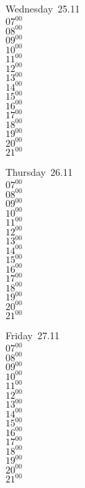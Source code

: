 \documentclass[11pt,a4paper]{book}\usepackage[]{graphicx}\usepackage[]{color}
\begin{document}
\begin{weekdaybox}
  Wednesday~25.11\\
  { 
  \vfill
  $07^{00}$\\
$08^{00}$\\
$09^{00}$\\
$10^{00}$\\
$11^{00}$\\
$12^{00}$\\
$13^{00}$\\
$14^{00}$\\
$15^{00}$\\
$16^{00}$\\
$17^{00}$\\
$18^{00}$\\
$19^{00}$\\
$20^{00}$\\
$21^{00}$\\
  }
\end{weekdaybox}
\clearpage
\begin{headerbox}
\end{headerbox}
\begin{weekdaybox}
  Thursday~26.11\\
  { 
  \vfill
  $07^{00}$\\
$08^{00}$\\
$09^{00}$\\
$10^{00}$\\
$11^{00}$\\
$12^{00}$\\
$13^{00}$\\
$14^{00}$\\
$15^{00}$\\
$16^{00}$\\
$17^{00}$\\
$18^{00}$\\
$19^{00}$\\
$20^{00}$\\
$21^{00}$\\
  }
\end{weekdaybox} 
\begin{weekdaybox}
  Friday~27.11\\
  { 
  \vfill
  $07^{00}$\\
$08^{00}$\\
$09^{00}$\\
$10^{00}$\\
$11^{00}$\\
$12^{00}$\\
$13^{00}$\\
$14^{00}$\\
$15^{00}$\\
$16^{00}$\\
$17^{00}$\\
$18^{00}$\\
$19^{00}$\\
$20^{00}$\\
$21^{00}$\\
  }
\end{weekdaybox}
\end{document}
